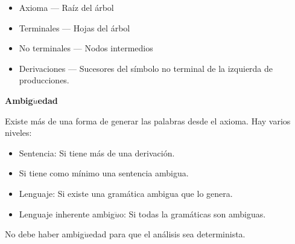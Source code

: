 \documentclass[12pt]{article}
\begin{document}
	\begin{itemize}
		\item Axioma --- Raíz del árbol
		\item Terminales --- Hojas del árbol
		\item No terminales --- Nodos intermedios
		\item Derivaciones --- Sucesores del símbolo no terminal de la 
		izquierda de producciones.
	\end{itemize}

	\textbf{Ambig$\ddot{u}$edad}

	Existe más de una forma de generar las palabras desde el axioma.
	Hay varios niveles:

	\begin{itemize}
		\item Sentencia: Si tiene más de una derivación.
		\item Si tiene como mínimo una sentencia ambigua.
		\item Lenguaje: Si existe una gramática ambigua que lo genera.
		\item Lenguaje inherente ambig$\ddot{u}$o: Si todas la gramáticas son
		ambiguas.
	\end{itemize}

	No debe haber ambig$\ddot{u}$edad para que el análisis sea determinista.
\end{document}
